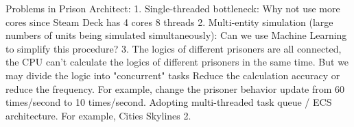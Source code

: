 Problems in Prison Architect:
1. Single-threaded bottleneck: Why not use more cores since Steam Deck has 4 cores 8 threads
2. Multi-entity simulation (large numbers of units being simulated simultaneously): Can we use Machine Learning to simplify this procedure?
3. The logics of different prisoners are all connected, the CPU can't calculate the logics of different prisoners in the same time.
But we may divide the logic into "concurrent" tasks
Reduce the calculation accuracy or reduce the frequency. For example, change the prisoner behavior update from 60 times/second to 10 times/second.
Adopting multi-threaded task queue / ECS architecture. For example, Cities Skylines 2.
